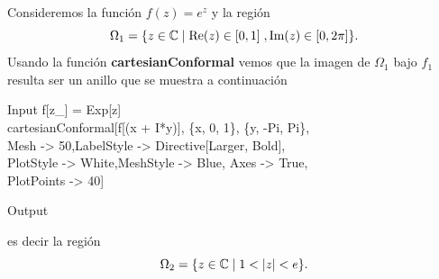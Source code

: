 \begin{Ejem}
	

Consideremos la función $f(z)=e^z$ y la región $$\Omega_{1}=\{z\in \mathbb{C} \mid \mbox{Re}(z)\in [0,1]\;, \mbox{Im}(z)\in [0,2\pi]\}.$$
Usando la función \textbf{cartesianConformal} vemos que la imagen de $\Omega_{1}$ bajo $f_1$ resulta ser un anillo que se muestra a continuación
\begin{mmaCell}{Input}
	 f[z_] = Exp[z] \\cartesianConformal[f[(x + I*y)], \{x, 0, 1\}, \{y, -Pi, Pi\},\\Mesh -> 50,LabelStyle -> Directive[Larger, Bold],\\PlotStyle -> White,MeshStyle -> Blue, Axes -> True,\\PlotPoints -> 40]
\end{mmaCell}
\begin{mmaCell}[moregraphics={moreig={scale=0.5}}]{Output}
\end{mmaCell}
es decir la región 
$$\Omega_{2}=\{z\in \C\mid 1<|z|<e\}.$$
\end{Ejem}


